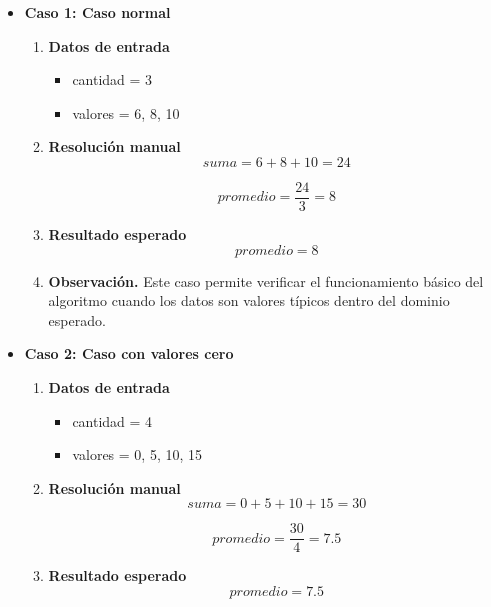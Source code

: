 \documentclass[12pt,twoside]{book}
\begin{document}
						\begin{itemize}
							\item \textbf{Caso 1: Caso normal}
								
								\begin{enumerate}
									\item \textbf{Datos de entrada}
										
										\begin{itemize}
											\item cantidad = 3
											\item valores = 6, 8, 10
										\end{itemize}
										
									\item \textbf{Resolución manual}
										\[
										suma = 6 + 8 + 10 = 24
										\]
										
										\[
										promedio = \frac{24}{3} = 8
										\]
										
									\item \textbf{Resultado esperado}
										\[
										promedio = 8
										\]
									
									\item \textbf{Observación.} Este caso permite verificar el funcionamiento básico del algoritmo cuando los datos son valores típicos dentro del dominio esperado.
								\end{enumerate}
							
							\item \textbf{Caso 2: Caso con valores cero}
								
								\begin{enumerate}
									\item \textbf{Datos de entrada}
										
										\begin{itemize}
											\item cantidad = 4
											\item valores = 0, 5, 10, 15
										\end{itemize}
										
									\item \textbf{Resolución manual}
										\[
										suma = 0 + 5 + 10 + 15 = 30
										\]
										
										\[
										promedio = \frac{30}{4} = 7.5
										\]
									\item \textbf{Resultado esperado}
										\[
										promedio = 7.5
										\]
										

\end{enumerate}
\end{itemize}
\end{document}
